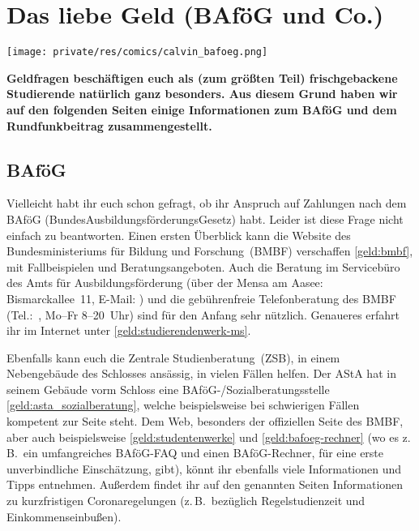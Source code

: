 \section{Das liebe Geld (BAföG und Co.)}

\begin{center}
	\vspace{-0.6cm}
	\texttt{[image: private/res/comics/calvin\_bafoeg.png]}
\end{center}

\begin{multicols}{2}
\textbf{Geldfragen beschäftigen euch als (zum größten Teil) frischgebackene Studierende natürlich ganz besonders.
Aus diesem Grund haben wir auf den folgenden Seiten einige Informationen zum BAföG und dem Rundfunkbeitrag zusammengestellt.}

\subsection{BAföG}
Vielleicht habt ihr euch schon gefragt, ob ihr Anspruch auf Zahlungen nach dem BAföG (BundesAusbildungsförderungsGesetz) habt.
Leider ist diese Frage nicht einfach zu beantworten.
Einen ersten Überblick kann die Website des Bundesministeriums für Bildung und Forschung~(BMBF) verschaffen \cref{geld:bmbf}, mit Fallbeispielen und Beratungsangeboten.
Auch die Beratung im Servicebüro des Amts für Ausbildungsförderung (über der Mensa am Aasee: Bismarckallee~11, E-Mail: ) und die gebührenfreie Telefonberatung des BMBF (Tel.:~, Mo–Fr 8–20~Uhr) sind für den Anfang sehr nützlich.
Genaueres erfahrt ihr im Internet unter \cref{geld:studierendenwerk-ms}.

Ebenfalls kann euch die Zentrale Studienberatung~(ZSB), in einem Nebengebäude des Schlosses ansässig, in vielen Fällen helfen.
Der AStA hat in seinem Gebäude vorm Schloss eine BAföG-/Sozial\-beratungsstelle \cref{geld:asta_sozialberatung}, welche beispielsweise bei schwierigen Fällen kompetent zur Seite steht.
Dem Web, besonders der offiziellen Seite des BMBF, aber auch beispielsweise \cref{geld:studentenwerke} und \cref{geld:bafoeg-rechner} (wo es z.\,B.\ ein umfangreiches BAföG-FAQ und einen BAföG-Rechner, für eine erste unverbindliche Einschätzung, gibt), könnt ihr ebenfalls viele Informationen und Tipps entnehmen.
Außerdem findet ihr auf den genannten Seiten Informationen zu kurzfristigen Coronaregelungen (z.\,B.\ bezüglich Regelstudienzeit und Einkommenseinbußen).


\end{multicols}
